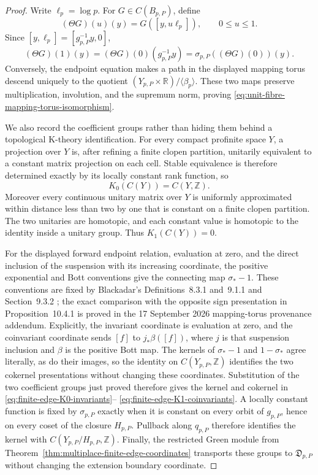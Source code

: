 \begin{proof}
Write \(\ell_p=\log p\).  For \(G\in C(B_{p,P})\), define
\[
 (\Theta G)(u)(y)=G([y,u\ell_p]),\qquad 0\leq u\leq1.
\]
Since \([y,\ell_p]=[g_{p,P}^{-1}y,0]\),
\[
 (\Theta G)(1)(y)=(\Theta G)(0)(g_{p,P}^{-1}y)
 =\sigma_{p,P}((\Theta G)(0))(y).
\]
Conversely, the endpoint equation makes a path in the displayed mapping
torus descend uniquely to the quotient
\((Y_{p,P}\times\mathbb R)/\langle\beta_p\rangle\).  These two maps preserve
multiplication, involution, and the supremum norm, proving
\eqref{eq:unit-fibre-mapping-torus-isomorphism}.

We also record the coefficient groups rather than hiding them behind a
topological K-theory identification.  For every compact profinite space
\(Y\), a projection over \(Y\) is, after refining a finite clopen partition,
unitarily equivalent to a constant matrix projection on each cell.  Stable
equivalence is therefore determined exactly by its locally constant rank
function, so
\[
 K_0(C(Y))=C(Y,\mathbb Z).
\]
Moreover every continuous unitary matrix over \(Y\) is uniformly approximated
within distance less than two by one that is constant on a finite clopen
partition.  The two unitaries are homotopic, and each constant value is
homotopic to the identity inside a unitary group.  Thus
\(K_1(C(Y))=0\).

For the displayed forward endpoint relation, evaluation at zero, and
the direct inclusion of the suspension with its increasing coordinate,
the positive exponential and Bott conventions give the connecting map
\(\sigma_*-1\).  These conventions are fixed by Blackadar's
Definitions~8.3.1 and~9.1.1 and Section~9.3.2
\cite[pp.~70--73, 77]{blackadar1986}; the exact comparison with the
opposite sign presentation in Proposition~10.4.1 is proved in the
17 September 2026 mapping-torus provenance addendum.
Explicitly, the invariant coordinate is evaluation at zero, and the
coinvariant coordinate sends \([f]\) to \(j_*\beta([f])\), where
\(j\) is that suspension inclusion and \(\beta\) is the positive Bott map.
The kernels of \(\sigma_*-1\) and \(1-\sigma_*\) agree literally, as do
their images, so the identity on \(C(Y_{p,P},\mathbb Z)\) identifies the
two cokernel presentations without changing these coordinates.
Substitution of the two coefficient groups just proved therefore gives
the kernel and cokernel in
\eqref{eq:finite-edge-K0-invariants}--
\eqref{eq:finite-edge-K1-coinvariants}.  A locally constant function is fixed
by \(\sigma_{p,P}\) exactly when it is constant on every orbit of
\(g_{p,P}\), hence on every coset of the closure \(H_{p,P}\).  Pullback along
\(q_{p,P}\) therefore identifies the kernel with
\(C(Y_{p,P}/H_{p,P},\mathbb Z)\).  Finally, the restricted Green module from
Theorem~\ref{thm:multiplace-finite-edge-coordinates} transports these groups
to \(\mathfrak D_{p,P}\) without changing the extension boundary coordinate.
\end{proof}

